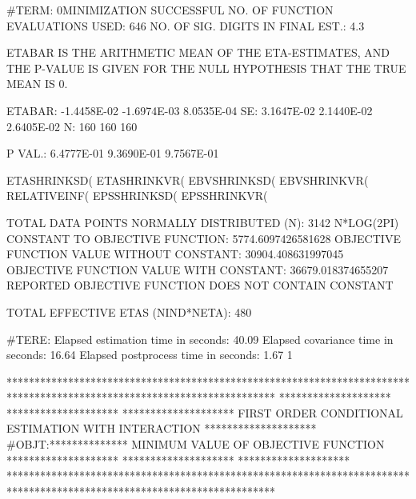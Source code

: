 \documentclass[
  letterpaper,
  toc=chapterentrywithdots,
  listof=totoc,
  11pt,
  headings=small,
  usegeometry]{scrreprt}
\begin{document}
\begin{nonmemlisting}
 #TERM:
0MINIMIZATION SUCCESSFUL
 NO. OF FUNCTION EVALUATIONS USED:      646
 NO. OF SIG. DIGITS IN FINAL EST.:  4.3

 ETABAR IS THE ARITHMETIC MEAN OF THE ETA-ESTIMATES,
 AND THE P-VALUE IS GIVEN FOR THE NULL HYPOTHESIS THAT THE TRUE MEAN IS 0.

 ETABAR:        -1.4458E-02 -1.6974E-03  8.0535E-04
 SE:             3.1647E-02  2.1440E-02  2.6405E-02
 N:                     160         160         160

 P VAL.:         6.4777E-01  9.3690E-01  9.7567E-01

 ETASHRINKSD(%
 ETASHRINKVR(%
 EBVSHRINKSD(%
 EBVSHRINKVR(%
 RELATIVEINF(%
 EPSSHRINKSD(%
 EPSSHRINKVR(%

  
 TOTAL DATA POINTS NORMALLY DISTRIBUTED (N):         3142
 N*LOG(2PI) CONSTANT TO OBJECTIVE FUNCTION:    5774.6097426581628     
 OBJECTIVE FUNCTION VALUE WITHOUT CONSTANT:    30904.408631997045     
 OBJECTIVE FUNCTION VALUE WITH CONSTANT:       36679.018374655207     
 REPORTED OBJECTIVE FUNCTION DOES NOT CONTAIN CONSTANT
  
 TOTAL EFFECTIVE ETAS (NIND*NETA):                           480
  
 #TERE:
 Elapsed estimation  time in seconds:    40.09
 Elapsed covariance  time in seconds:    16.64
 Elapsed postprocess time in seconds:     1.67
1
 
 
 
 
 
 
 
 
 
 
 
 
 
 
 
 
 
 
 
 
 ************************************************************************************************************************
 ********************                                                                                ********************
 ********************               FIRST ORDER CONDITIONAL ESTIMATION WITH INTERACTION              ********************
 #OBJT:**************                       MINIMUM VALUE OF OBJECTIVE FUNCTION                      ********************
 ********************                                                                                ********************
 ************************************************************************************************************************
 






\end{nonmemlisting}
\end{document}
